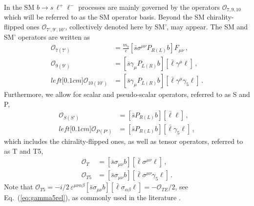 In the SM $b \to s\,\ell^+\ell^-$ processes are mainly governed by the operators
$\mathcal{O}_{7,9,10}$ which will be referred to as the SM operator basis. Beyond the SM
chirality-flipped ones $\mathcal{O}_{7',9',10'}$, collectively denoted here by SM', may
appear. The SM and SM' operators are written as \cite{Bobeth:2007dw,
  Altmannshofer:2008dz, Kruger:2005ep}
\begin{equation}
\begin{aligned}
  \mathcal{O}_{7(7')} & = \frac{m_b}{e}\!\left\lbrack\bar{s} \sigma^{\mu\nu} P_{R(L)} b\right\rbrack F_{\mu\nu} \,,
\\
  \mathcal{O}_{9(9')} & = \left\lbrack\bar{s} \gamma_\mu P_{L(R)} b\right\rbrack\!\left\lbrack\bar{\ell} \gamma^\mu \ell\right\rbrack \,,
\\left\lbrack0.1cm]
  \mathcal{O}_{10(10')} & = \left\lbrack\bar{s} \gamma_\mu P_{L(R)} b\right\rbrack\!\left\lbrack\bar{\ell} \gamma^\mu \gamma_5 \ell\right\rbrack \,.
\end{aligned}
\label{eq:SM:ops}
\end{equation}
Furthermore, we allow for scalar and pseudo-scalar operators, referred to as S
and P,
\begin{equation}
\begin{aligned}
    \mathcal{O}_{S(S')}   & = \left\lbrack\bar{s} P_{R(L)} b\right\rbrack\!\left\lbrack\bar{\ell} \ell\right\rbrack \,,
\\left\lbrack0.1cm]
    \mathcal{O}_{P(P')}   & = \left\lbrack\bar{s} P_{R(L)} b\right\rbrack\!\left\lbrack\bar{\ell} \gamma_5 \ell\right\rbrack \,,
\end{aligned}
\label{eq:psd-scalar:ops}
\end{equation}
which includes the chirality-flipped ones, as well as tensor operators, referred
to as T and T5,
\begin{equation}
\begin{aligned}
  \mathcal{O}_T   & = \left\lbrack\bar{s} \sigma_{\mu\nu} b\right\rbrack\!\left\lbrack\bar{\ell} \sigma^{\mu\nu} \ell\right\rbrack \,,
\\
  \mathcal{O}_{T5} & = \left\lbrack\bar{s} \sigma_{\mu\nu} b\right\rbrack \left\lbrack\bar{\ell} \sigma^{\mu\nu} \gamma_5 \ell\right\rbrack \,.
\end{aligned}
\label{eq:tensor:ops}
\end{equation}
Note that $\mathcal{O}_{T5} = - i/2\, \varepsilon^{\mu\nu\alpha\beta}
    \left\lbrack\bar{s} \sigma_{\mu\nu} b\right\rbrack\!\left\lbrack\bar{\ell} \sigma_{\alpha\beta} \ell\right\rbrack
  = - \mathcal{O}_{TE}/2$,
see Eq.~(\ref{eq:gamma5rel}),
as commonly used in the literature \cite{Bobeth:2007dw,Kim:2007fx, Alok:2010zd}.

